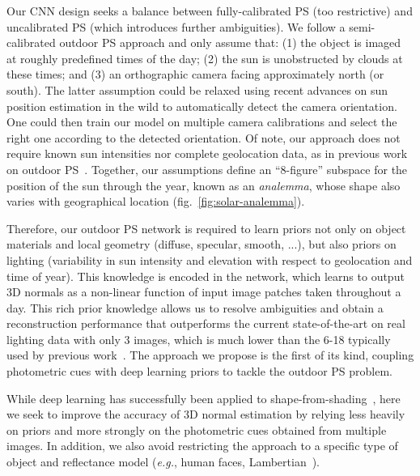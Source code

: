 Our CNN design seeks a balance between fully-calibrated PS (too restrictive) and uncalibrated PS (which introduces further ambiguities). We follow a semi-calibrated outdoor PS approach and only assume that: (1) the object is imaged at roughly predefined times of the day; (2) the sun is unobstructed by clouds at these times; and (3) an orthographic camera facing approximately north (or south). The latter assumption could be relaxed using recent advances on sun position estimation in the wild to automatically detect the camera orientation. One could then train our model on multiple camera calibrations and select the right one according to the detected orientation. Of note, our approach does not require known sun intensities nor complete geolocation data, as in previous work on outdoor PS~\cite{jung-cvpr-15}. Together, our assumptions define an ``8-figure'' subspace for the position of the sun through the year, known as an {\em analemma}, whose shape also varies with geographical location (fig.~\ref{fig:solar-analemma}).



Therefore, our outdoor PS network is required to learn priors not only on object materials and local geometry (diffuse, specular, smooth, ...), but also priors on lighting (variability in sun intensity and elevation with respect to geolocation and time of year). This knowledge is encoded in the network, which learns to output 3D normals as a non-linear function of input image patches taken throughout a day. This rich prior knowledge allows us to resolve ambiguities and obtain a reconstruction performance that outperforms the current state-of-the-art on real lighting data with only 3 images, which is much lower than the 6-18 typically used by previous work~\cite{yu-iccp-13,jung-cvpr-15}. The approach we propose is the first of its kind, coupling photometric cues with deep learning priors to tackle the outdoor PS problem.

While deep learning has successfully been applied to shape-from-shading~\cite{eigen-iccv-15,shu-cvpr-17,wu-nips-17}, here we seek to improve the accuracy of 3D normal estimation by relying less heavily on priors and more strongly on the photometric cues obtained from multiple images. In addition, we also avoid restricting the approach to a specific type of object and reflectance model ({\em e.g.}, human faces, Lambertian~\cite{shu-cvpr-17}).


